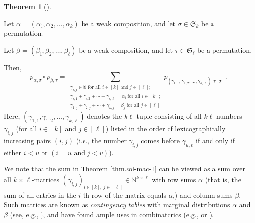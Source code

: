 \documentclass[numbers=enddot,12pt,final,onecolumn,notitlepage]{scrartcl}%
\theoremstyle{definition}
\newtheorem{theo}{Theorem}[section]
\newenvironment{theorem}[1][]
{\begin{theo}[#1]\begin{leftbar}}
{\end{leftbar}\end{theo}}
\let\sumnonlimits\sum
\renewcommand{\sum}{\sumnonlimits\limits}
\begin{document}
\begin{theorem}
\label{thm.sol-mac-1}Let $\alpha=\left(  \alpha_{1},\alpha_{2},\ldots
,\alpha_{k}\right)  $ be a weak composition, and let $\sigma\in\mathfrak{S}%
_{k}$ be a permutation.

Let $\beta=\left(  \beta_{1},\beta_{2},\ldots,\beta_{\ell}\right)  $ be a weak
composition, and let $\tau\in\mathfrak{S}_{\ell}$ be a permutation.

Then,%
\[
p_{\alpha,\sigma}\circ p_{\beta,\tau}=\sum_{\substack{\gamma_{i,j}%
\in\mathbb{N}\text{ for all }i\in\left[  k\right]  \text{ and }j\in\left[
\ell\right]  ;\\\gamma_{i,1}+\gamma_{i,2}+\cdots+\gamma_{i,\ell}=\alpha
_{i}\text{ for all }i\in\left[  k\right]  ;\\\gamma_{1,j}+\gamma_{2,j}%
+\cdots+\gamma_{k,j}=\beta_{j}\text{ for all }j\in\left[  \ell\right]
}}p_{\left(  \gamma_{1,1},\gamma_{1,2},\ldots,\gamma_{k,\ell}\right)
,\tau\left[  \sigma\right]  }.
\]
Here, $\left(  \gamma_{1,1},\gamma_{1,2},\ldots,\gamma_{k,\ell}\right)  $
denotes the $k\ell$-tuple consisting of all $k\ell$ numbers $\gamma_{i,j}$
(for all $i\in\left[  k\right]  $ and $j\in\left[  \ell\right]  $) listed in
the order of lexicographically increasing pairs $\left(  i,j\right)  $ (i.e.,
the number $\gamma_{i,j}$ comes before $\gamma_{u,v}$ if and only if either
$i<u$ or $\left(  i=u\text{ and }j<v\right)  $).
\end{theorem}


We note that the sum in Theorem \ref{thm.sol-mac-1} can be viewed as a sum
over all $k\times\ell$-matrices $\left(  \gamma_{i,j}\right)  _{i\in\left[
k\right]  ,\ j\in\left[  \ell\right]  }\in\mathbb{N}^{k\times\ell}$ with row
sums $\alpha$ (that is, the sum of all entries in the $i$-th row of the matrix
equals $\alpha_{i}$) and column sums $\beta$. Such matrices are known as
\emph{contingency tables} with marginal distributions $\alpha$ and $\beta$
(see, e.g., \cite[\S 1]{LyuPak20}), and have found ample uses in combinatorics
(e.g., \cite[Corollary 1.3.11]{JamKer81} or \cite[Definition 4.3.4]{GriRei}).
\end{document}
